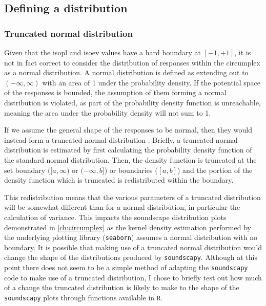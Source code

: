 \subsection{Defining a distribution}

\subsubsection{Truncated normal distribution}

Given that the \gls{isopl} and \gls{isoev} values have a hard boundary at $[-1, +1]$, it is not in fact correct to consider the distribution of responses within the circumplex as a normal distribution. A normal distribution is defined as extending out to $(-\infty, \infty)$ with an area of 1 under the probability density. If the potential space of the responses is bounded, the assumption of them forming a normal distribution is violated, as part of the probability density function is unreachable, meaning the area under the probability density will not sum to 1.

If we assume the general shape of the responses to be normal, then they would instead form a truncated normal distribution . Briefly, a truncated normal distribution is estimated by first calculating the probability density function of the standard normal distribution. Then, the density function is truncated at the set boundary ($[a, \infty)$ or $(-\infty, b]$) or boundaries ($[a, b]$) and the portion of the density function which is truncated is redistributed within the boundary.

This redistribution means that the various parameters of a truncated distribution will be somewhat different than for a normal distribution, in particular the calculation of variance. This impacts the soundscape distribution plots demonstrated in \cref{ch:circumplex} as the kernel density estimation performed by the underlying plotting library (\texttt{seaborn}) assumes a normal distribution with no boundary. It is possible that making use of a truncated normal distribution would change the shape of the distributions produced by \texttt{soundscapy}. Although at this point there does not seem to be a simple method of adapting the \texttt{soundscapy} code to make use of a truncated distribution, I chose to briefly test out how much of a change the truncated distribution is likely to make to the shape of the \texttt{soundscapy} plots through functions available in \texttt{R}. 

